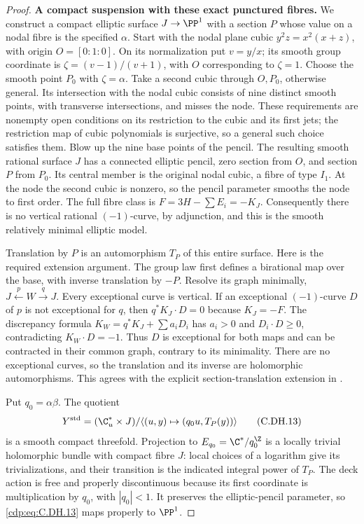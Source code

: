 \begin{proof}
\par\medskip\noindent\textbf{A compact suspension with these exact punctured fibres.}
We construct a compact elliptic
surface $J\to\PP^1$ with a
section $P$ whose value on a
nodal fibre is the specified
$\alpha$. Start with the
nodal plane cubic
$y^2z=x^2(x+z)$, with origin
$O=[0:1:0]$. On its
normalization put
$v=y/x$; its smooth group
coordinate is
$\zeta=(v-1)/(v+1)$,
with $O$ corresponding to
$\zeta=1$. Choose the
smooth point $P_0$ with
$\zeta=\alpha$.
Take a second cubic
through $O,P_0$, otherwise
general. Its intersection
with the nodal cubic
consists of nine distinct
smooth points, with
transverse intersections,
and misses the node.
These requirements are
nonempty open conditions
on its restriction to
the cubic and its first
jets; the restriction
map of cubic polynomials
is surjective, so a
general such choice
satisfies them.
Blow up the nine
base points of the
pencil. The resulting
smooth rational surface
$J$ has a connected
elliptic pencil, zero
section from $O$, and
section $P$ from $P_0$.
Its central member is
the original nodal
cubic, a fibre of type
$I_1$. At the node the
second cubic is nonzero,
so the pencil parameter
smooths the node to
first order. The full
fibre class is
$F=3H-\sum E_i=-K_J$.
Consequently there is
no vertical rational
$(-1)$-curve, by
adjunction, and this
is the smooth relatively
minimal elliptic model.

Translation by $P$ is an
automorphism $T_P$ of
this entire surface.
Here is the required
extension argument.
The group law first
defines a birational
map over the base,
with inverse translation
by $-P$. Resolve its
graph minimally,
$J\xleftarrow{p}W\xrightarrow{q}J$.
Every exceptional curve
is vertical. If an
exceptional $(-1)$-curve
$D$ of $p$ is not
exceptional for $q$,
then $q^*K_J\cdot D=0$
because $K_J=-F$.
The discrepancy formula
$K_W=q^*K_J+\sum a_iD_i$
has $a_i>0$ and
$D_i\cdot D\ge0$,
contradicting $K_W\cdot D=-1$.
Thus $D$ is exceptional
for both maps and can
be contracted in their
common graph, contrary
to its minimality.
There are no exceptional
curves, so the translation
and its inverse are
holomorphic automorphisms.
This agrees with the explicit
section-translation extension
in \cite[\S7.6]{SchuttShioda2010}.

Put $q_0=\alpha\beta$.
The quotient
\[
 Y^{\rm std}=(\C^*_u\times J)/
        \langle(u,y)\mapsto(q_0u,T_P(y))\rangle
                                                               \tag{C.DH.13}\label{cdp:eq:C.DH.13}
\]
is a smooth compact
threefold. Projection to
$E_{q_0}=\C^*/q_0^{\Z}$
is a locally trivial
holomorphic bundle with
compact fibre $J$:
local choices of a
logarithm give its
trivializations, and
their transition is
the indicated integral
power of $T_P$.
The deck action is
free and properly
discontinuous because
its first coordinate
is multiplication by
$q_0$, with $|q_0|<1$.
It preserves the
elliptic-pencil parameter,
so \eqref{cdp:eq:C.DH.13} maps
properly to $\PP^1$.


\end{proof}
